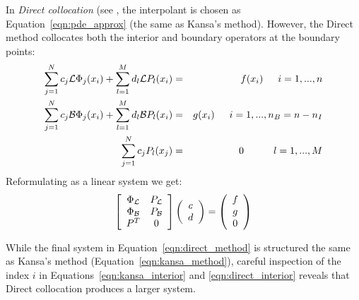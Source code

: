 \documentclass{report}
\begin{document}
{In \emph{Direct collocation} (see \cite{Larsson:2003, Fedoseyev:2002}, the interpolant is chosen as Equation~\ref{eqn:pde_approx} (the same as Kansa's method). However, the Direct method collocates both the interior and boundary operators at the boundary points:
\begin{eqnarray}
\sum_{j=1}^{N}c_j\mathcal{L}\Phi_j(x_i) + \sum_{l=1}^{M}d_l \mathcal{L}P_l(x_i) &=&f(x_i)  \hskip1.5em i = 1,...,n  \label{eqn:direct_interior} \\ 
\sum_{j=1}^{N}c_j\mathcal{B}\Phi_j(x_i) + \sum_{l=1}^{M}d_l \mathcal{B}P_l(x_i) &=& g(x_i)  \hskip1.5em i = 1,..., n_B=n-n_I \label{eqn:direct_boundary} \\
 \sum_{j=1}^{N} c_j P_l(x_j) &=& 0 \hskip3.0em l=1,...,M \label{eqn:direct_moments} 
\end{eqnarray}
Reformulating as a linear system we get: 
\begin{eqnarray}
\left[ \begin{array}{c c} 
	\Phi_{\mathcal{L}} & P_{\mathcal{L}} \\
	\Phi_{\mathcal{B}} & P_{\mathcal{B}} \\
	P^T  & 0 \\
	\end{array} \right] \left( \begin{array}{c}
							{c} \\
							{d}
							 \end{array}
						 \right) = \left( \begin{array}{c}
							{f} \\
							{g} \\
							0
							 \end{array}
						 \right) 
	\label{eqn:direct_method}
\end{eqnarray}

While the final system in Equation~\ref{eqn:direct_method} is structured the same as Kansa's method (Equation~\ref{eqn:kansa_method}), %
careful inspection of the index $i$ in Equations~\ref{eqn:kansa_interior} and \ref{eqn:direct_interior} reveals that Direct collocation produces a larger system. %


}
\end{document}
